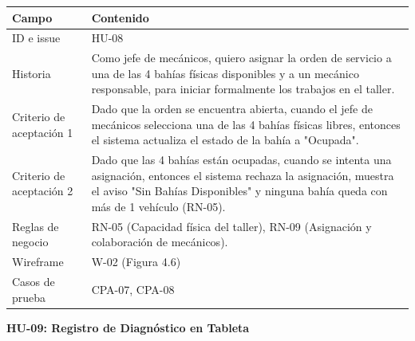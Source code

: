 {\def\LTcaptype{none} %
\begin{longtable}[]{@{}
  >{\raggedright\arraybackslash}p{}
  >{\raggedright\arraybackslash}p{}@{}}
\toprule\noalign{}
\begin{minipage}[b]{\linewidth}\raggedright
\textbf{Campo}
\end{minipage} & \begin{minipage}[b]{\linewidth}\raggedright
\textbf{Contenido}
\end{minipage} \\
\midrule\noalign{}
\endhead
\bottomrule\noalign{}
\endlastfoot
ID e issue & HU-08 \\
Historia & Como jefe de mecánicos, quiero asignar la orden de servicio a
una de las 4 bahías físicas disponibles y a un mecánico responsable,
para iniciar formalmente los trabajos en el taller. \\
Criterio de aceptación 1 & Dado que la orden se encuentra abierta,
cuando el jefe de mecánicos selecciona una de las 4 bahías físicas
libres, entonces el sistema actualiza el estado de la bahía a
"Ocupada". \\
Criterio de aceptación 2 & Dado que las 4 bahías están ocupadas, cuando
se intenta una asignación, entonces el sistema rechaza la asignación,
muestra el aviso "Sin Bahías Disponibles" y ninguna bahía queda con más
de 1 vehículo (RN-05). \\
Reglas de negocio & RN-05 (Capacidad física del taller), RN-09
(Asignación y colaboración de mecánicos). \\
Wireframe & W-02 (Figura 4.6) \\
Casos de prueba & CPA-07, CPA-08 \\
\end{longtable}
}

\textbf{HU-09: Registro de Diagnóstico en Tableta}


